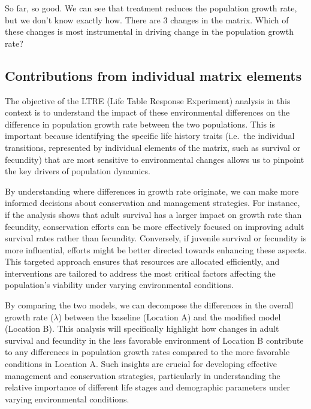 \documentclass[
  a4paper]{book}
\begin{document}
So far, so good. We can see that treatment reduces the population growth rate, but we don't know exactly how. There are 3 changes in the matrix. Which of these changes is most instrumental in driving change in the population growth rate?

\subsection{Contributions from individual matrix elements}\label{contributions-from-individual-matrix-elements}

The objective of the LTRE (Life Table Response Experiment) analysis in this context is to understand the impact of these environmental differences on the difference in population growth rate between the two populations. This is important because identifying the specific life history traits (i.e.~the individual transitions, represented by individual elements of the matrix, such as survival or fecundity) that are most sensitive to environmental changes allows us to pinpoint the key drivers of population dynamics.

By understanding where differences in growth rate originate, we can make more informed decisions about conservation and management strategies. For instance, if the analysis shows that adult survival has a larger impact on growth rate than fecundity, conservation efforts can be more effectively focused on improving adult survival rates rather than fecundity. Conversely, if juvenile survival or fecundity is more influential, efforts might be better directed towards enhancing these aspects. This targeted approach ensures that resources are allocated efficiently, and interventions are tailored to address the most critical factors affecting the population's viability under varying environmental conditions.

By comparing the two models, we can decompose the differences in the overall growth rate (\(\lambda\)) between the baseline (Location A) and the modified model (Location B). This analysis will specifically highlight how changes in adult survival and fecundity in the less favorable environment of Location B contribute to any differences in population growth rates compared to the more favorable conditions in Location A. Such insights are crucial for developing effective management and conservation strategies, particularly in understanding the relative importance of different life stages and demographic parameters under varying environmental conditions.
\end{document}
